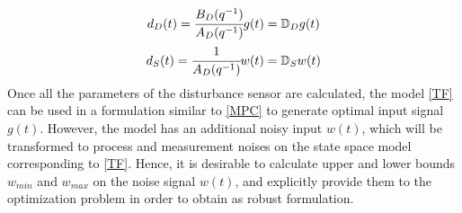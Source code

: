 \documentclass[letterpaper, 10 pt, conference]{ieeeconf}  %
\begin{document}
\begin{enumerate}
	\begin{equation*}
	\begin{matrix}
	d_D(t) = \cfrac{B_D(q^{-1})}{A_D(q^{-1})}g(t) = \mathbb{D}_D g(t) \vspace{4pt} \\  
	d_S(t) = \cfrac{1}{A_D(q^{-1})}w(t) = \mathbb{D}_S w(t)
	\end{matrix}
	\end{equation*}
	Once all the parameters of the disturbance sensor are calculated, the model \eqref{TF} can be used in a formulation similar to \eqref{MPC} to generate optimal input signal $g(t)$. However, the model has an additional noisy input $w(t)$, which will be transformed to process and measurement noises on the state space model corresponding to \eqref{TF}. Hence, it is desirable to calculate upper and lower bounds $w_{min}$ and $w_{max}$ on the noise signal $w(t)$, and explicitly provide them to the optimization problem in order to obtain as robust formulation.\\

\end{enumerate}
\end{document}
